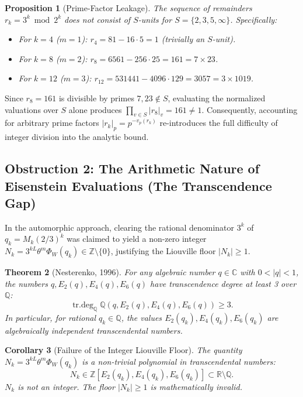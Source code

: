 \documentclass[11pt,reqno]{article}
\theoremstyle{plain}
\newtheorem{theorem}{Theorem}[section]
\newtheorem{proposition}[theorem]{Proposition}
\newtheorem{corollary}[theorem]{Corollary}
\theoremstyle{definition}
\numberwithin{equation}{section}
\begin{document}
\begin{proposition}[Prime-Factor Leakage]\label{prop:leakage}
The sequence of remainders $r_k = 3^k \bmod 2^k$ does not consist of $S$-units for $S = \{2, 3, 5, \infty\}$. Specifically:
\begin{itemize}
    \item For $k = 4$ ($m=1$): $r_4 = 81 - 16 \cdot 5 = 1$ (trivially an $S$-unit).
    \item For $k = 8$ ($m=2$): $r_8 = 6561 - 256 \cdot 25 = 161 = 7 \times 23$.
    \item For $k = 12$ ($m=3$): $r_{12} = 531441 - 4096 \cdot 129 = 3057 = 3 \times 1019$.
\end{itemize}
\end{proposition}

Since $r_8 = 161$ is divisible by primes $7, 23 \notin S$, evaluating the normalized valuations over $S$ alone produces $\prod_{v \in S} |r_8|_v = 161 \ne 1$. Consequently, accounting for arbitrary prime factors $|r_k|_p = p^{-v_p(r_k)}$ re-introduces the full difficulty of integer division into the analytic bound.

\subsection{Obstruction 2: The Arithmetic Nature of Eisenstein Evaluations (The Transcendence Gap)}
In the automorphic approach, clearing the rational denominator $3^k$ of $q_k = M_k (2/3)^k$ was claimed to yield a non-zero integer $N_k = 3^{k L} \theta^m \Phi_W(q_k) \in \mathbb{Z} \setminus \{0\}$, justifying the Liouville floor $|N_k| \ge 1$.

\begin{theorem}[Nesterenko, 1996]\label{thm:nesterenko}
For any algebraic number $q \in \mathbb{C}$ with $0 < |q| < 1$, the numbers $q, E_2(q), E_4(q), E_6(q)$ have transcendence degree at least 3 over $\mathbb{Q}$:
\begin{equation}
\operatorname{tr.deg}_{\mathbb{Q}} \mathbb{Q}(q, E_2(q), E_4(q), E_6(q)) \ge 3.
\end{equation}
In particular, for rational $q_k \in \mathbb{Q}$, the values $E_2(q_k), E_4(q_k), E_6(q_k)$ are algebraically independent transcendental numbers.
\end{theorem}

\begin{corollary}[Failure of the Integer Liouville Floor]
The quantity $N_k = 3^{k L} \theta^m \Phi_W(q_k)$ is a non-trivial polynomial in transcendental numbers:
\begin{equation}
N_k \in \mathbb{Z}[E_2(q_k), E_4(q_k), E_6(q_k)] \subset \mathbb{R} \setminus \mathbb{Q}.
\end{equation}
$N_k$ is not an integer. The floor $|N_k| \ge 1$ is mathematically invalid.
\end{corollary}
\end{document}
